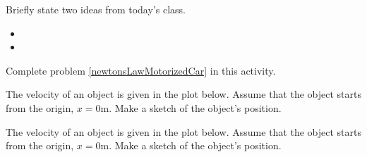 \postClass

\begin{problem}
\item Briefly state two ideas from today's class.
  \begin{itemize}
  \item 
  \item 
  \end{itemize}
\item Complete problem \ref{newtonsLawMotorizedCar} in this activity.
\end{problem}



\begin{problem}
\item The velocity of an object is given in the plot
  below. Assume that the object starts from the origin, $x=0$m. Make a
  sketch of the object's position.

  \scalebox{0.7}{}

  \clearpage

\item The velocity of an object is given in the plot
  below. Assume that the object starts from the origin, $x=0$m. Make a
  sketch of the object's position.

  \scalebox{0.7}{}

\end{problem}


